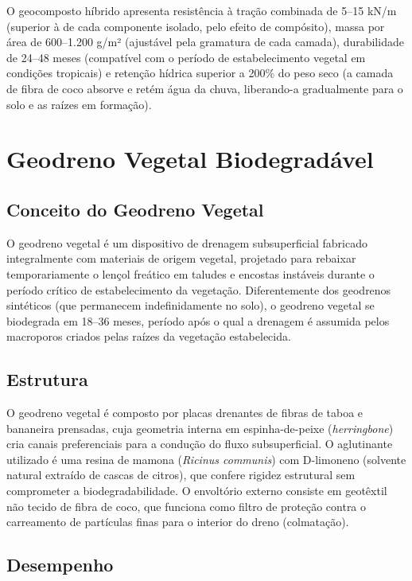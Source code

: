 \documentclass[
  portuguese,
  11pt,
  a4paper,
  open=any]{scrbook}
\begin{document}
O geocomposto híbrido apresenta resistência à tração combinada de 5--15
kN/m (superior à de cada componente isolado, pelo efeito de compósito),
massa por área de 600--1.200 g/m² (ajustável pela gramatura de cada
camada), durabilidade de 24--48 meses (compatível com o período de
estabelecimento vegetal em condições tropicais) e retenção hídrica
superior a 200\% do peso seco (a camada de fibra de coco absorve e retém
água da chuva, liberando-a gradualmente para o solo e as raízes em
formação).

\section{Geodreno Vegetal
Biodegradável}\label{geodreno-vegetal-biodegraduxe1vel}

\subsection{Conceito do Geodreno
Vegetal}\label{conceito-do-geodreno-vegetal}

O geodreno vegetal é um dispositivo de drenagem subsuperficial fabricado
integralmente com materiais de origem vegetal, projetado para rebaixar
temporariamente o lençol freático em taludes e encostas instáveis
durante o período crítico de estabelecimento da vegetação.
Diferentemente dos geodrenos sintéticos (que permanecem indefinidamente
no solo), o geodreno vegetal se biodegrada em 18--36 meses, período após
o qual a drenagem é assumida pelos macroporos criados pelas raízes da
vegetação estabelecida.

\subsection{Estrutura}\label{estrutura}

O geodreno vegetal é composto por placas drenantes de fibras de taboa e
bananeira prensadas, cuja geometria interna em espinha-de-peixe
(\emph{herringbone}) cria canais preferenciais para a condução do fluxo
subsuperficial. O aglutinante utilizado é uma resina de mamona
(\emph{Ricinus communis}) com D-limoneno (solvente natural extraído de
cascas de citros), que confere rigidez estrutural sem comprometer a
biodegradabilidade. O envoltório externo consiste em geotêxtil não
tecido de fibra de coco, que funciona como filtro de proteção contra o
carreamento de partículas finas para o interior do dreno (colmatação).

\subsection{Desempenho}\label{desempenho}
\end{document}
